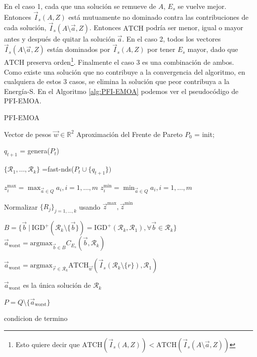 En el caso 1, cada que una solución se remueve de $A$, $E_s$ se vuelve mejor. Entonces $\vec{I}_s(A,Z)$ está mutuamente no dominado contra las contribuciones de cada solución, $\vec{I}_s(A \setminus {\vec{a}},Z)$. Entonces $\text{ATCH}$ podría ser menor, igual o mayor antes y después de quitar la solución $\vec{a}$. En el caso 2, todos los vectores  $\vec{I}_s(A \setminus {\vec{a}},Z)$ están dominados por  $\vec{I}_s(A ,Z)$ por tener $E_s$ mayor, dado que $\text{ATCH}$ preserva orden\footnote{Esto quiere decir que $\text{ATCH}(\vec{I}_s(A,Z))< \text{ATCH}(\vec{I}_s(A \setminus {\vec{a}},Z))$}. Finalmente el caso 3 es una combinación de ambos. Como existe una solución que no contribuye a la convergencia del algoritmo, en cualquiera de estos 3 casos, se elimina la solución que peor contribuya a la Energía-S. En el Algoritmo \ref{alg:PFI-EMOA} podemos ver el pseudocódigo de PFI-EMOA.


\begin{algorithm}
    \caption{PFI-EMOA}\label{alg:PFI-EMOA}
    \begin{algorithmic}[1] %
        \Require Vector de pesos $\vec{w}\in \mathbb{R}^2$ 
        \Ensure  Aproximación del Frente de Pareto
        \State $P_0$ = init;

        \Repeat
                
        $q_{t+1}$ = genera($P_t$)
        
        $\{\mathcal{R_1},\ldots,\mathcal{R}_k\}$ =fast-nds($P_t \cup \{q_{t+1}\})$
        

        \State $z_i^{\max} = \max_{\vec{a}\in Q} a_i, i=1,\ldots,m$
        \State $z_i^{\min} = \min_{\vec{a}\in Q} a_i, i=1,\ldots,m$

        Normalizar $\{R_j\}_{j=1,\ldots,k}$ usando $\vec{z}^{\max}, \vec{z}^{\min}$

        \State $B = \{\vec{b} \ |\  \text{IGD}^+(\mathcal{R}_k \setminus \{\vec{b}\})=\text{IGD}^+(\mathcal{R}_k,\mathcal{R}_1), \forall \vec{b} \in \mathcal{R}_k\}$
        $\vec{a}_{\text{worst}}=\text{argmax}_{\vec{b}\in B} C_{E_s}(\vec{b},\mathcal{R}_k)$ 
        \Else 
        
        $\vec{a}_{\text{worst}}=\text{argmax}_{\vec{r}\in \mathcal{R}_k} \text{ATCH}_{\vec{w}}(\vec{I}_s(\mathcal{R}_k \setminus \{r\}),\mathcal{R}_1)$ 
        
        

        \EndIf

            \Else 

            $\vec{a}_{\text{worst}}$ es la única solución de $\mathcal{R}_k$
        \EndIf 

        $P=Q\setminus \{\vec{a}_{\text{worst}}\}$
     
        
        \Until condicion de termino

    \end{algorithmic}
\end{algorithm}


